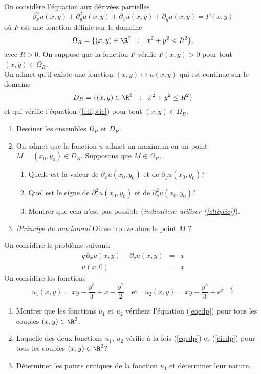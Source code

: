 \begin{exo}
    On considère l'équation aux dérivées partielles
    \begin{equation}
        \partial_{x}^{2}u(x,y) + \partial_{y}^{2}u(x,y) + \partial_{x}u(x,y) + \partial_{y}u(x,y) = F(x,y)
        \label{elliptic}
    \end{equation}
    où $F$ est une fonction définie sur le domaine
    $$
        \Omega_{R} = \{(x,y) \in \R ^{2} \ \ : \ \ x^2 + y^2 < R^{2} \},
    $$
    avec $R>0$. On suppose que la fonction $F$ vérifie $F(x,y)>0$ pour tout $(x,y) \in \Omega_{R}$.\\
    On admet qu'il existe une fonction $(x,y) \mapsto u(x,y)$ qui est continue sur le domaine
    $$
        D_{R} = \{(x,y) \in \R ^{2} \ \ : \ \ x^2 + y^2 \leq R^{2} \}
    $$
    et qui vérifie l'équation (\ref{elliptic}) pour tout $(x,y) \in \Omega_{R}$.
    \begin{enumerate}
        \item Dessiner les ensembles $\Omega_{R}$ et $D_{R}$.
        \item On admet que la fonction $u$ admet un maximum en un point $M = (x_{0},y_{0}) \in D_{R}$. Supposons que $M \in \Omega_{R}$.
        \begin{enumerate}
            \item Quelle est la valeur de $\partial_{x}u(x_{0},y_{0})$ et de $\partial_{y}u(x_{0},y_{0})$?
            \item Quel est le signe de $\partial_{x}^{2}u(x_{0},y_{0})$ et de $\partial_{y}^{2}u(x_{0},y_{0})$?
            \item Montrer que cela n'est pas possible ({\it indication: utiliser (\ref{elliptic})}).
        \end{enumerate}
        \item \textit{[Principe du maximum]} Où se trouve alors le point $M$ ?
    \end{enumerate}
\end{exo}

\begin{exo}
    On considère le problème suivant:
    \begin{eqnarray}
        y\,\partial_xu(x,y)+\partial_yu(x,y)&=&x\label{eqedp}\\
        u(x,0)&=&x\label{ciedp}
    \end{eqnarray}
    On considère les fonctions
    $$
        u_1(x,y)=xy-\frac{y^3}{3}+x-\frac{y^2}{2}\quad\mathrm{et}\quad u_2(x,y)=xy-\frac{y^3}{3}+e^{x-\frac{y^2}{2}}
    $$
    \begin{enumerate}
        \item Montrer que les fonctions $u_1$ et $u_2$ vérifient l'équation (\ref{eqedp}) pour tous les couples $(x,y)\in\R^2$.
        \item Laquelle des deux fonctions $u_1$, $u_2$ vérifie à la fois (\ref{eqedp}) et (\ref{ciedp}) pour tous les couples $(x,y)\in\R^2$?
        \item Déterminer les points critiques de la fonction $u_1$ et déterminer leur nature.
    \end{enumerate}
\end{exo}


